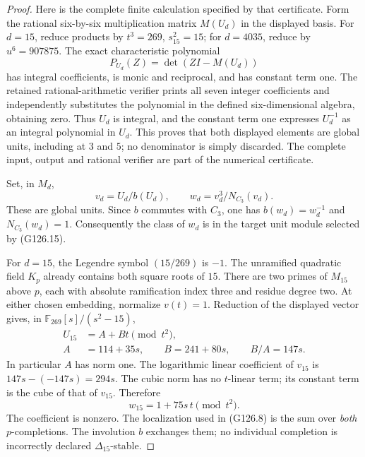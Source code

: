 \begin{proof}
Here is the complete finite calculation specified by that
certificate.  Form the rational six-by-six multiplication
matrix \(M(U_d)\) in the displayed basis.  For \(d=15\),
reduce products by \(t^3=269\), \(s_{15}^2=15\);
for \(d=4035\), reduce by \(u^6=907875\).
The exact characteristic polynomial
\[
               P_{U_d}(Z)=\det(ZI-M(U_d))
 \tag{G126.16}
\]
has integral coefficients, is monic and reciprocal, and
has constant term one.  The retained rational-arithmetic
verifier prints all seven integer coefficients and
independently substitutes the polynomial in the defined
six-dimensional algebra, obtaining zero.
Thus \(U_d\) is integral, and the constant term one expresses
\(U_d^{-1}\) as an integral polynomial in \(U_d\).
This proves that both displayed elements are global units,
including at \(3\) and \(5\); no denominator is simply
discarded.  The complete input, output and rational verifier
are part of the numerical certificate.

Set, in \(M_d\),
\[
                  v_d=U_d/b(U_d),\qquad
                  w_d=v_d^3/N_{C_3}(v_d).
 \tag{G126.17}
\]
These are global units.  Since \(b\) commutes with \(C_3\),
one has \(b(w_d)=w_d^{-1}\) and \(N_{C_3}(w_d)=1\).
Consequently the class of \(w_d\) is in the target unit
module selected by (G126.15).

For \(d=15\), the Legendre symbol \((15/269)\) is \(-1\).
The unramified quadratic field \(K_p\) already contains
both square roots of \(15\).
There are two primes of \(M_{15}\) above \(p\), each with
absolute ramification index three and residue degree two.
At either chosen embedding, normalize \(v(t)=1\).
Reduction of the displayed vector gives, in
\(\mathbb F_{269}[s]/(s^2-15)\),
\[
 \begin{split}
 U_{15}&=A+Bt\pmod {t^2},\\
 A&=114+35s,\qquad B=241+80s,\qquad B/A=147s .
 \end{split}
 \tag{G126.18}
\]
In particular \(A\) has norm one.
The logarithmic linear coefficient of \(v_{15}\) is
\(147s-(-147s)=294s\).
The cubic norm has no \(t\)-linear term; its constant
term is the cube of that of \(v_{15}\).
Therefore
\[
                         w_{15}=1+75s\,t\pmod {t^2}.
 \tag{G126.19}
\]
The coefficient is nonzero.
The localization used in (G126.8) is the sum over
\emph{both} \(p\)-completions.  The involution \(b\)
exchanges them; no individual completion is incorrectly
declared \(\Delta_{15}\)-stable.


\end{proof}
